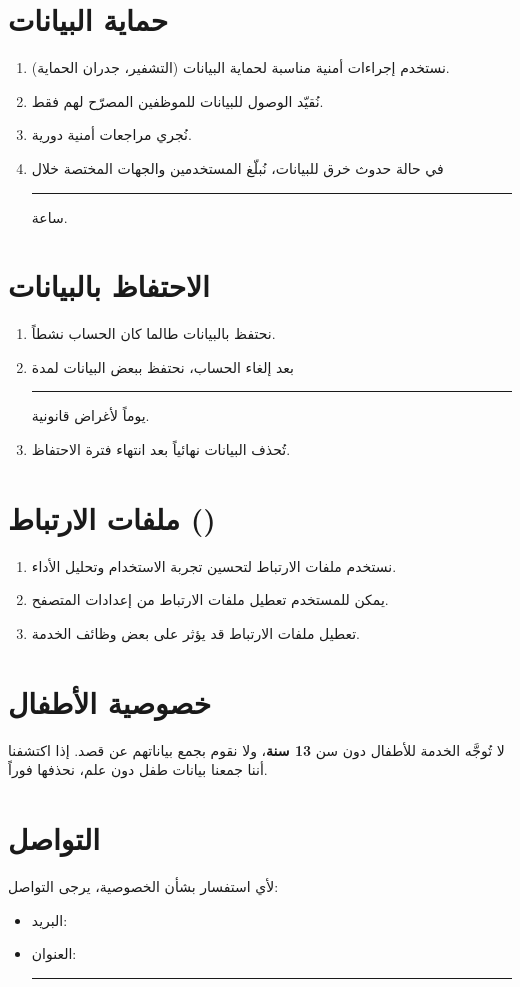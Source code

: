 \documentclass[11pt,a4paper]{article}
\begin{document}
\section{حماية البيانات}
\label{sec:data_security}
\begin{enumerate}
    \item نستخدم إجراءات أمنية مناسبة لحماية البيانات (التشفير، جدران الحماية).
    \item نُقيّد الوصول للبيانات للموظفين المصرّح لهم فقط.
    \item نُجري مراجعات أمنية دورية.
    \item في حالة حدوث خرق للبيانات، نُبلّغ المستخدمين والجهات المختصة خلال \rule{2cm}{0.4pt} ساعة.
\end{enumerate}

\section{الاحتفاظ بالبيانات}
\label{sec:data_retention}
\begin{enumerate}
    \item نحتفظ بالبيانات طالما كان الحساب نشطاً.
    \item بعد إلغاء الحساب، نحتفظ ببعض البيانات لمدة \rule{2cm}{0.4pt} يوماً لأغراض قانونية.
    \item تُحذف البيانات نهائياً بعد انتهاء فترة الاحتفاظ.
\end{enumerate}

\section{ملفات الارتباط ()}
\label{sec:cookies}
\begin{enumerate}
    \item نستخدم ملفات الارتباط لتحسين تجربة الاستخدام وتحليل الأداء.
    \item يمكن للمستخدم تعطيل ملفات الارتباط من إعدادات المتصفح.
    \item تعطيل ملفات الارتباط قد يؤثر على بعض وظائف الخدمة.
\end{enumerate}

\section{خصوصية الأطفال}
\label{sec:children}
لا تُوجَّه الخدمة للأطفال دون سن \textbf{13 سنة}، ولا نقوم بجمع بياناتهم عن قصد. إذا اكتشفنا أننا جمعنا بيانات طفل دون علم، نحذفها فوراً.

\section{التواصل}
\label{sec:contact}
لأي استفسار بشأن الخصوصية، يرجى التواصل:
\begin{itemize}
    \item البريد: 
    \item العنوان: \rule{8cm}{0.4pt}
\end{itemize}
\end{document}
